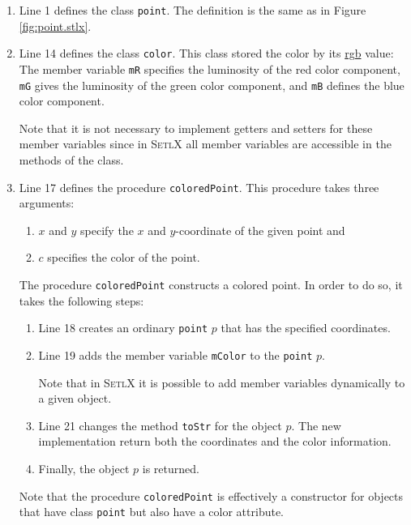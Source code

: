 \begin{enumerate}
\item Line 1 defines the class \texttt{point}.  The definition is the same as in Figure
     \ref{fig:point.stlx}.
\item Line 14 defines the class \texttt{color}.  This class stored the color by its 
      \href{http://en.wikipedia.org/wiki/RGB_color_model}{rgb} value: The member variable
      \texttt{mR} specifies the luminosity of the red color component, \texttt{mG} gives the 
      luminosity of the green color component, and \texttt{mB} defines the blue color component.

      Note that it is not necessary to implement getters and setters for these member variables since
      in \textsc{SetlX} all member variables are accessible in the methods of the class.
\item Line 17 defines the procedure \texttt{coloredPoint}.  This procedure takes three arguments:
      \begin{enumerate}
      \item $x$ and $y$ specify the $x$ and $y$-coordinate of the given point and
      \item $c$ specifies the color of the point.
      \end{enumerate}
      The procedure \texttt{coloredPoint} constructs a colored point.  In order to do so, it takes 
      the following steps:
      \begin{enumerate}
      \item Line 18 creates an ordinary \texttt{point} $p$ that has the specified coordinates.
      \item Line 19 adds the member variable \texttt{mColor} to the \texttt{point} $p$.

            Note that in \textsc{SetlX} it is possible to add member variables dynamically to a given object.
      \item Line 21 changes the method \texttt{toStr} for the object $p$.  The new implementation
            return both the coordinates and the color information.
      \item Finally, the object $p$ is returned.
      \end{enumerate}
      Note that the procedure \texttt{coloredPoint} is effectively a constructor for objects
      that have class \texttt{point} but also have a color attribute.
\end{enumerate}




